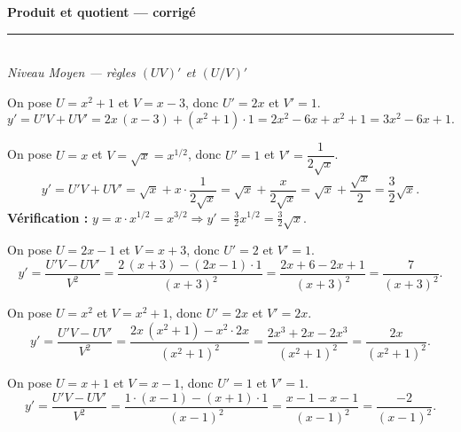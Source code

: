\pagestyle{fancy}\fancyhf{}
\fancyfoot[C]{\small\thepage}
\renewcommand{\headrulewidth}{0.8pt}



\begin{center}
{\LARGE\bfseries\color{primarydark} Produit et quotient --- corrigé}\\[2pt]
{\color{primary}\rule{0.5\textwidth}{1.2pt}}\\[4pt]
{\small\itshape Niveau Moyen --- règles $(UV)'$ et $(U/V)'$}
\end{center}
\vspace{2mm}

\begin{corr}
On pose $U=x^{2}+1$ et $V=x-3$, donc $U'=2x$ et $V'=1$.
\[
y'=U'V+UV'=2x\,(x-3)+(x^{2}+1)\cdot 1
=2x^{2}-6x+x^{2}+1=3x^{2}-6x+1.
\]
\end{corr}

\begin{corr}
On pose $U=x$ et $V=\sqrt{x}=x^{1/2}$, donc $U'=1$ et $V'=\dfrac{1}{2\sqrt{x}}$.
\[
y'=U'V+UV'=\sqrt{x}+x\cdot\frac{1}{2\sqrt{x}}
=\sqrt{x}+\frac{x}{2\sqrt{x}}=\sqrt{x}+\frac{\sqrt{x}}{2}=\frac{3}{2}\sqrt{x}.
\]
\textbf{Vérification :} $y=x\cdot x^{1/2}=x^{3/2}\Rightarrow y'=\tfrac32 x^{1/2}=\tfrac32\sqrt{x}$. \checkmark
\end{corr}

\begin{corr}
On pose $U=2x-1$ et $V=x+3$, donc $U'=2$ et $V'=1$.
\[
y'=\frac{U'V-UV'}{V^{2}}
=\frac{2\,(x+3)-(2x-1)\cdot 1}{(x+3)^{2}}
=\frac{2x+6-2x+1}{(x+3)^{2}}=\frac{7}{(x+3)^{2}}.
\]
\end{corr}

\begin{corr}
On pose $U=x^{2}$ et $V=x^{2}+1$, donc $U'=2x$ et $V'=2x$.
\[
y'=\frac{U'V-UV'}{V^{2}}
=\frac{2x\,(x^{2}+1)-x^{2}\cdot 2x}{(x^{2}+1)^{2}}
=\frac{2x^{3}+2x-2x^{3}}{(x^{2}+1)^{2}}=\frac{2x}{(x^{2}+1)^{2}}.
\]
\end{corr}

\begin{corr}
On pose $U=x+1$ et $V=x-1$, donc $U'=1$ et $V'=1$.
\[
y'=\frac{U'V-UV'}{V^{2}}
=\frac{1\cdot(x-1)-(x+1)\cdot 1}{(x-1)^{2}}
=\frac{x-1-x-1}{(x-1)^{2}}=\frac{-2}{(x-1)^{2}}.
\]
\end{corr}


